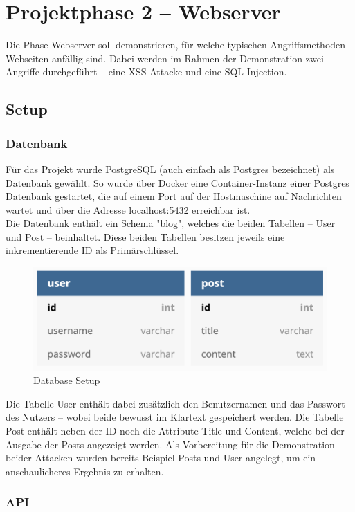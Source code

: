 \chapter{Projektphase 2 – Webserver}
Die Phase Webserver soll demonstrieren, für welche typischen Angriffsmethoden Webseiten anfällig sind. Dabei werden im Rahmen der Demonstration zwei Angriffe durchgeführt – eine \ac{XSS} Attacke und eine SQL Injection. 
\section{Setup}
\subsection{Datenbank}
Für das Projekt wurde PostgreSQL (auch einfach als Postgres bezeichnet) als Datenbank gewählt. So wurde über Docker eine Container-Instanz einer Postgres Datenbank gestartet, die auf einem Port auf der Hostmaschine auf Nachrichten wartet und über die Adresse localhost:5432 erreichbar ist. \\
Die Datenbank enthält ein Schema "blog", welches die beiden Tabellen – User und Post – beinhaltet. Diese beiden Tabellen besitzen jeweils eine inkrementierende ID als Primärschlüssel. 

\begin{figure}
    \includegraphics[width=\linewidth]{img/database.png}
    \caption{Database Setup}
    \label{fig:database}
\end{figure}

Die Tabelle User enthält dabei zusätzlich den Benutzernamen und das Passwort des Nutzers – wobei beide bewusst im Klartext gespeichert werden. 
Die Tabelle Post enthält neben der ID noch die Attribute Title und Content, welche bei der Ausgabe der Posts angezeigt werden. 
Als Vorbereitung für die Demonstration beider Attacken wurden bereits Beispiel-Posts und User angelegt, um ein anschaulicheres Ergebnis zu erhalten.
\pagebreak
\subsection{API}

